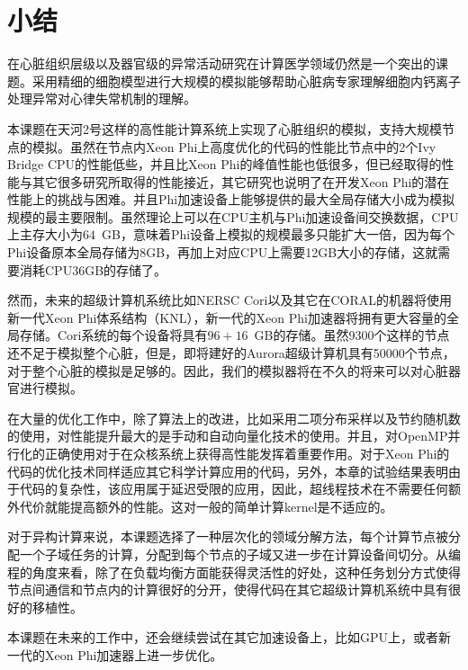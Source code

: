 \section{小结}
在心脏组织层级以及器官级的异常活动研究在计算医学领域仍然是一个突出的课题。采用精细的细胞模型进行大规模的模拟能够帮助心脏病专家理解细胞内钙离子处理异常对心律失常机制的理解。

本课题在天河2号这样的高性能计算系统上实现了心脏组织的模拟，支持大规模节点的模拟。虽然在节点内Xeon Phi上高度优化的代码的性能比节点中的2个Ivy Bridge CPU的性能低些，并且比Xeon Phi的峰值性能也低很多，但已经取得的性能与其它很多研究所取得的性能接近，其它研究也说明了在开发Xeon Phi的潜在性能上的挑战与困难。并且Phi加速设备上能够提供的最大全局存储大小成为模拟规模的最主要限制。虽然理论上可以在CPU主机与Phi加速设备间交换数据，CPU上主存大小为$64$~GB，意味着Phi设备上模拟的规模最多只能扩大一倍，因为每个Phi设备原本全局存储为8GB，再加上对应CPU上需要12GB大小的存储，这就需要消耗CPU36GB的存储了。

然而，未来的超级计算机系统比如NERSC Cori以及其它在CORAL的机器将使用新一代Xeon Phi体系结构（KNL），新一代的Xeon Phi加速器将拥有更大容量的全局存储。Cori系统的每个设备将具有$96+16$~GB的存储。虽然9300个这样的节点还不足于模拟整个心脏，但是，即将建好的Aurora超级计算机具有50000个节点，对于整个心脏的模拟是足够的。因此，我们的模拟器将在不久的将来可以对心脏器官进行模拟。

在大量的优化工作中，除了算法上的改进，比如采用二项分布采样以及节约随机数的使用，对性能提升最大的是手动和自动向量化技术的使用。并且，对OpenMP并行化的正确使用对于在众核系统上获得高性能发挥着重要作用。对于Xeon Phi的代码的优化技术同样适应其它科学计算应用的代码，另外，本章的试验结果表明由于代码的复杂性，该应用属于延迟受限的应用，因此，超线程技术在不需要任何额外代价就能提高额外的性能。这对一般的简单计算kernel是不适应的。

对于异构计算来说，本课题选择了一种层次化的领域分解方法，每个计算节点被分配一个子域任务的计算，分配到每个节点的子域又进一步在计算设备间切分。从编程的角度来看，除了在负载均衡方面能获得灵活性的好处，这种任务划分方式使得节点间通信和节点内的计算很好的分开，使得代码在其它超级计算机系统中具有很好的移植性。

本课题在未来的工作中，还会继续尝试在其它加速设备上，比如GPU上，或者新一代的Xeon Phi加速器上进一步优化。
